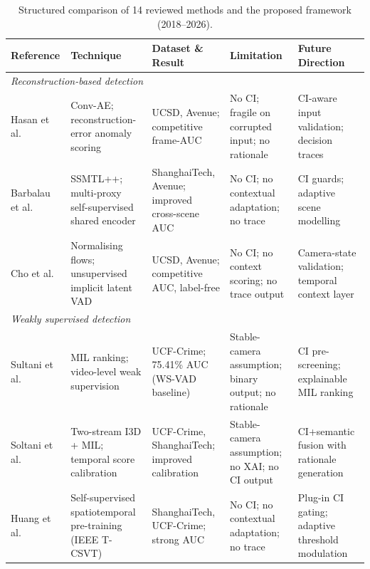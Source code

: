 \documentclass[a4paper,fleqn]{cas-dc}
\begin{document}
\begin{table}[t]
\caption{Structured comparison of 14 reviewed methods and the proposed framework (2018--2026).}
\label{tab:relatedwork}
\centering
\scriptsize
\setlength{\tabcolsep}{3pt}
\renewcommand{\arraystretch}{1.22}
\begin{tabularx}{\textwidth}{p{2.2cm} X X X X}
\toprule
\textbf{Reference} &
\textbf{Technique} &
\textbf{Dataset \& Result} &
\textbf{Limitation} &
\textbf{Future Direction} \\
\midrule
 
\multicolumn{5}{l}{\textit{Reconstruction-based detection}} \\[1pt]
 
Hasan et al.~\citep{hasan2016anomaly}
  & Conv-AE; reconstruction-error anomaly scoring
  & UCSD, Avenue; competitive frame-AUC
  & No CI; fragile on corrupted input; no rationale
  & CI-aware input validation; decision traces \\
 
Barbalau et al.~\citep{barbalau2023ssmtl}
  & SSMTL++; multi-proxy self-supervised shared encoder
  & ShanghaiTech, Avenue; improved cross-scene AUC
  & No CI; no contextual adaptation; no trace
  & CI guards; adaptive scene modelling \\
 
Cho et al.~\citep{cho2023lookonce}
  & Normalising flows; unsupervised implicit latent VAD
  & UCSD, Avenue; competitive AUC, label-free
  & No CI; no context scoring; no trace output
  & Camera-state validation; temporal context layer \\[3pt]
 
\multicolumn{5}{l}{\textit{Weakly supervised detection}} \\[1pt]
 
Sultani et al.~\citep{sultani2018realworld}
  & MIL ranking; video-level weak supervision
  & UCF-Crime; 75.41\% AUC (WS-VAD baseline)
  & Stable-camera assumption; binary output; no rationale
  & CI pre-screening; explainable MIL ranking \\
 
Soltani et al.~\citep{soltani2024i3dAnomaly}
  & Two-stream I3D + MIL; temporal score calibration
  & UCF-Crime, ShanghaiTech; improved calibration
  & Stable-camera assumption; no XAI; no CI output
  & CI+semantic fusion with rationale generation \\
 
Huang et al.~\citep{huang2024selfsupervised}
  & Self-supervised spatiotemporal pre-training (IEEE T-CSVT)
  & ShanghaiTech, UCF-Crime; strong AUC
  & No CI; no contextual adaptation; no trace
  & Plug-in CI gating; adaptive threshold modulation \\[3pt]
 

\end{tabularx}
\end{table}
\end{document}
